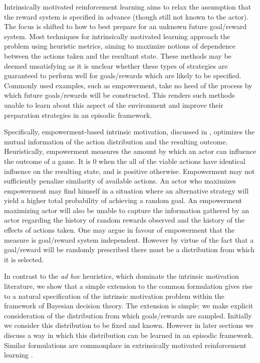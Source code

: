 \documentclass{article}
\begin{document}
Intrinsically motivated reinforcement learning aims to relax the assumption that the reward system is specified in advance (though still not known to the actor). The focus is shifted to how to best prepare for an unknown future goal/reward system. Most techniques for intrinsically motivated learning approach the problem using heuristic metrics, aiming to maximize notions of dependence between the actions taken and the resultant state. These methods may be deemed unsatisfying as it is unclear whether these types of strategies are guaranteed to perform well for goals/rewards which are likely to be specified. Commonly used examples, such as empowerment, take no heed of the process by which future goals/rewards will be constructed. This renders such methods unable to learn about this aspect of the environment and improve their preparation strategies in an episodic framework.    

Specifically, empowerment-based intrinsic motivation, discussed in \citep{mohamed2015variational}, optimizes the mutual information of the action distribution and the resulting outcome. Heuristically, empowerment measures the amount by which an actor can influence the outcome of a game. It is $0$ when the all of the viable actions have identical influence on the resulting state, and is positive otherwise. Empowerment may not sufficiently penalize similarity of available actions. An actor who maximizes empowerment may find himself in a situation where an alternative strategy will yield a higher total probability of achieving a random goal. An empowerment maximizing actor will also be unable to capture the information gathered by an actor regarding the history of random rewards observed and the history of the effects of actions taken. One may argue in favour of empowerment that the measure is goal/reward system independent. However by virtue of the fact that a goal/reward will be randomly prescribed there must be a distribution from which it is selected.  

In contrast to the \textit{ad hoc} heuristics, which dominate the intrinsic motivation literature, we show that a simple extension to the common formulation gives rise to a natural specification of the intrinsic motivation problem within the framework of Bayesian decision theory. The extension is simple: we make explicit consideration of the distribution from which goals/rewards are sampled. Initially we consider this distribution to be fixed and known. However in later sections we discuss a way in which this distribution can be learned in an episodic framework.  Similar formulations are commonplace in extrinsically motivated reinforcement learning \cite{sutton1998reinforcement}. 
\end{document}
